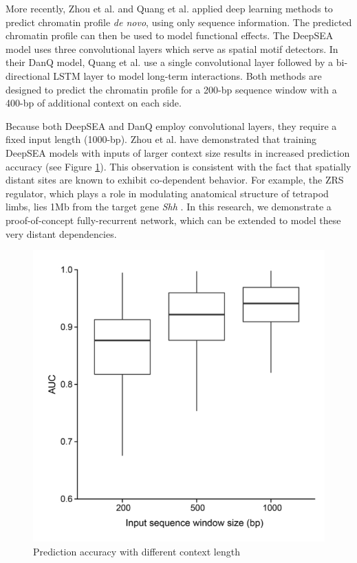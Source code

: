 \documentclass{article}
\begin{document}
More recently, Zhou et al. \cite{zhou2015predicting} and Quang et al. \cite{quang2016danq} applied deep learning methods to predict chromatin profile {\it de novo}, using only sequence information. The predicted chromatin profile can then be used to model functional effects.  The DeepSEA model \cite{zhou2015predicting}  uses three convolutional layers which serve as spatial motif detectors. In their DanQ model, Quang et al. use a single convolutional layer followed by a bi-directional LSTM layer to model long-term interactions. Both methods are designed to predict the chromatin profile for a 200-bp sequence window with a 400-bp of additional context on each side.

Because both DeepSEA and DanQ employ convolutional layers, they require a fixed input length (1000-bp).  Zhou et al. \cite{zhou2015predicting} have demonstrated that training DeepSEA models with inputs of larger context size results in increased prediction accuracy (see Figure \ref{figs:context-acc}). This observation is consistent with the fact that spatially distant sites are known to exhibit co-dependent behavior.  For example, the ZRS regulator, which plays a role in modulating anatomical structure of tetrapod limbs, lies 1Mb from the target gene {\it Shh} \cite{lettice2003long}.  In this research, we demonstrate a proof-of-concept fully-recurrent network, which can be extended to model these very distant dependencies.

\begin{figure}[h]
\begin{center}
\includegraphics[width=.6\textwidth]{figures/context-acc.png}
\caption{Prediction accuracy with different context length}
\label{figs:context-acc}
\end{center}
\end{figure}
\end{document}

